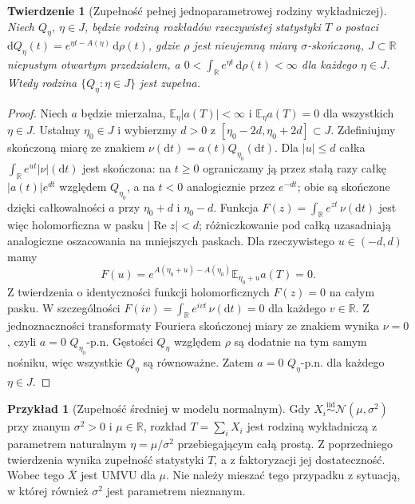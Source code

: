 \documentclass[11pt,a4paper,oneside]{report}
\numberwithin{equation}{chapter}
\theoremstyle{plain}
\newtheorem{twierdzenie}{Twierdzenie}[chapter]
\theoremstyle{definition}
\newtheorem{przyklad}{Przykład}[chapter]
\theoremstyle{remark}
\newcommand{\R}{\mathbb R}
\newcommand{\E}{\mathbb E}
\newcommand{\dd}{\mathrm d}
\newcommand{\Normal}{\mathcal N}
\newcommand{\iid}{\mathrel{\overset{\mathrm{iid}}\sim}}
\begin{document}
\begin{twierdzenie}[Zupełność pełnej jednoparametrowej rodziny wykładniczej]
\label{thm:complete-exponential-family}
Niech $Q_\eta$, $\eta\in J$, będzie rodziną rozkładów rzeczywistej
statystyki $T$ o postaci
$\dd Q_\eta(t)=e^{\eta t-A(\eta)}\,\dd\rho(t)$,
gdzie $\rho$ jest nieujemną miarą $\sigma$-skończoną,
$J\subset\R$ niepustym \emph{otwartym przedziałem}, a
$0<\int_{\R}e^{\eta t}\,\dd\rho(t)<\infty$ dla każdego $\eta\in J$.
Wtedy rodzina $\{Q_\eta:\eta\in J\}$ jest zupełna.
\end{twierdzenie}
\begin{proof}
Niech $a$ będzie mierzalna, $\E_\eta|a(T)|<\infty$
i $\E_\eta a(T)=0$ dla wszystkich $\eta\in J$.
Ustalmy $\eta_0\in J$ i wybierzmy $d>0$ z
$[\eta_0-2d,\eta_0+2d]\subset J$.
Zdefiniujmy skończoną miarę ze znakiem
$\nu(\dd t)=a(t)Q_{\eta_0}(\dd t)$. Dla $|u|\le d$
całka $\int_{\R}e^{u t}|\nu|(\dd t)$ jest skończona:
na $t\ge0$ ograniczamy ją przez stałą razy całkę
$|a(t)|e^{dt}$ względem $Q_{\eta_0}$,
a na $t<0$ analogicznie przez $e^{-dt}$;
obie są skończone dzięki całkowalności $a$ przy
$\eta_0+d$ i $\eta_0-d$. Funkcja
$F(z)=\int_{\R}e^{zt}\,\nu(\dd t)$ jest więc holomorficzna
w pasku $|\operatorname{Re}z|<d$; różniczkowanie pod całką
uzasadniają analogiczne oszacowania na mniejszych paskach.
Dla rzeczywistego $u\in(-d,d)$ mamy
\[
F(u)=e^{A(\eta_0+u)-A(\eta_0)}\E_{\eta_0+u}a(T)=0.
\]
Z twierdzenia o identyczności funkcji holomorficznych
$F(z)=0$ na całym pasku. W szczególności
$F(iv)=\int_{\R}e^{ivt}\,\nu(\dd t)=0$ dla każdego $v\in\R$.
Z jednoznaczności transformaty Fouriera skończonej miary
ze znakiem wynika $\nu=0$, czyli $a=0$ $Q_{\eta_0}$-p.n.
Gęstości $Q_\eta$ względem $\rho$ są dodatnie na tym samym
nośniku, więc wszystkie $Q_\eta$ są równoważne. Zatem
$a=0$ $Q_\eta$-p.n. dla każdego $\eta\in J$.
\end{proof}
\begin{przyklad}[Zupełność średniej w modelu normalnym]
Gdy $X_i\iid\Normal(\mu,\sigma^2)$ przy znanym $\sigma^2>0$
i $\mu\in\R$, rozkład $T=\sum_iX_i$ jest rodziną wykładniczą
z parametrem naturalnym $\eta=\mu/\sigma^2$ przebiegającym
całą prostą. Z poprzedniego twierdzenia wynika zupełność
statystyki $T$, a z faktoryzacji jej dostateczność.
Wobec tego $\bar X$ jest UMVU dla $\mu$. Nie należy
mieszać tego przypadku z sytuacją, w której również
$\sigma^2$ jest parametrem nieznanym.
\end{przyklad}
\end{document}
